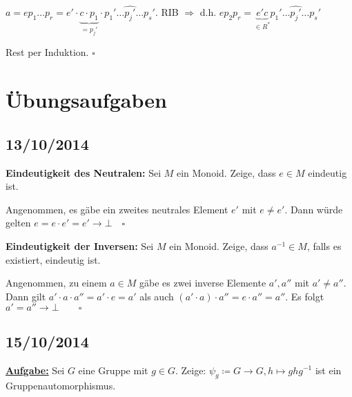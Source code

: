 \documentclass[10pt,a4paper]{article}
\begin{document}
$a = e p_1 \dots p_r = e' \cdot \underbrace{c \cdot p_1}_{= p_j'} \cdot p_1' \dots \hat{p_j'} \dots p_s'$. RIB $\Rightarrow$ d.h. $e p_2 p_r = \underbrace{e' c}_{\in R^*} p_1' \dots \hat{p_j'} \dots p_s'$

Rest per Induktion. $\square$


\newpage
\section{Übungsaufgaben}

\subsection{13/10/2014}

\textbf{Eindeutigkeit des Neutralen:} Sei $M$ ein Monoid. Zeige, dass $e \in M$ eindeutig ist.\bigskip

Angenommen, es gäbe ein zweites neutrales Element $e'$ mit $e \neq e'$. Dann würde gelten $e = e \cdot e' = e' \rightarrow \bot \quad \square$\bigskip

\textbf{Eindeutigkeit der Inversen:} Sei $M$ ein Monoid. Zeige, dass $a^{-1} \in M$, falls es existiert, eindeutig ist.\bigskip

Angenommen, zu einem $a \in M$ gäbe es zwei inverse Elemente $a', a''$ mit $a' \neq a''$. Dann gilt $a' \cdot a \cdot a''= a' \cdot e = a'$ als auch $(a' \cdot a) \cdot a'' = e \cdot a'' = a''$. Es folgt $a' = a'' \rightarrow \bot \qquad \square$

\subsection{15/10/2014}

\textbf{\underline{Aufgabe:}} Sei $G$ eine Gruppe mit $g \in G$. Zeige: $\psi_g \coloneqq G \to G, h \mapsto g h g^{-1}$ ist ein Gruppenautomorphismus.
\end{document}
